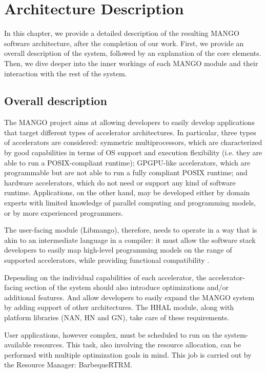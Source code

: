 \chapter{Architecture Description} \label{ch:ArchitectureDescription}

In this chapter, we provide a detailed description of the resulting MANGO software architecture, after the completion of our work.
First, we provide an overall description of the system, followed by an explanation of the core elements. Then, we dive deeper into the inner workings of each MANGO module and their interaction with the rest of the system.

\section{Overall description}

The MANGO project aims at allowing developers to easily develop applications that target different types of accelerator architectures. In particular, three types of accelerators are considered: symmetric multiprocessors, which are characterized by good capabilities in terms of OS support and execution flexibility (i.e. they are able to run a POSIX-compliant runtime); GPGPU-like accelerators, which are programmable but are not able to run a fully compliant POSIX runtime; and hardware accelerators, which do not need or support any kind  of software runtime. Applications, on the other hand, may be developed either by domain experts with limited knowledge of parallel computing and programming models, or by more experienced programmers. 

The user-facing module (Libmango), therefore, needs to operate in a way that is akin to an intermediate language in a compiler: it must allow the software stack developers to easily map high-level programming models on the range of supported accelerators, while providing functional compatibility \cite{mango_exploring_manycore_architectures}. 

Depending on the individual capabilities of each accelerator, the accelerator-facing section of the system should also introduce optimizations and/or additional features. And allow developers to easily expand the MANGO system by adding support of other architectures. The HHAL module, along with platform libraries (NAN, HN and GN), take care of these requirements.

User applications, however complex, must be scheduled to run on the system-available resources. This task, also involving the resource allocation, can be performed with multiple optimization goals in mind. This job is carried out by the Resource Manager: BarbequeRTRM.

